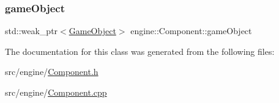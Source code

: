 \mbox{\label{classengine_1_1_component_a7466d237293a5911f53227a9ec036b71}} 
\subsubsection{\texorpdfstring{game\+Object}{gameObject}}
{\footnotesize\ttfamily std\+::weak\+\_\+ptr$<$\mbox{\hyperlink{classengine_1_1_game_object}{Game\+Object}}$>$ engine\+::\+Component\+::game\+Object\hspace{0.3cm}{\ttfamily [private]}}



The documentation for this class was generated from the following files\+:\begin{DoxyCompactItemize}
\item 
src/engine/\mbox{\hyperlink{_component_8h}{Component.\+h}}\item 
src/engine/\mbox{\hyperlink{_component_8cpp}{Component.\+cpp}}\end{DoxyCompactItemize}
